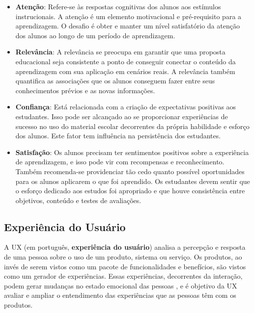 \begin{itemize}[label={},leftmargin=2em]
\item \textbf{Atenção}: Refere-se às respostas cognitivas dos alunos aos estímulos instrucionais. A atenção é um elemento motivacional e pré-requisito para a aprendizagem. O desafio é obter e manter um nível satisfatório da atenção dos alunos ao longo de um período de aprendizagem.
\end{itemize}

\begin{itemize}[label={},leftmargin=2em]
\item \textbf{Relevância}: A relevância se preocupa em garantir que uma proposta educacional seja consistente a ponto de conseguir conectar o conteúdo da aprendizagem com sua aplicação em cenários reais. A relevância também quantifica as associações que os alunos conseguem fazer entre seus conhecimentos prévios e as novas informações.
\end{itemize}

\begin{itemize}[label={},leftmargin=2em]
\item \textbf{Confiança}: Está relacionada com a criação de expectativas positivas aos estudantes. Isso pode ser alcançado ao se proporcionar experiências de sucesso no uso do material escolar decorrentes da própria habilidade e esforço dos alunos. Este fator tem influência na persistência dos estudantes.
\end{itemize}

\begin{itemize}[label={},leftmargin=2em]
\item \textbf{Satisfação}: Os alunos precisam ter sentimentos positivos sobre a experiência de aprendizagem, e isso pode vir com recompensas e reconhecimento. Também recomenda-se providenciar tão cedo quanto possível oportunidades para os alunos aplicarem o que foi aprendido. Os estudantes devem sentir que o esforço dedicado aos estudos foi apropriado e que houve consistência entre objetivos, conteúdo e testes de avaliações.
\end{itemize}

\pagebreak


\subsection{Experiência do Usuário}
\label{EEUU}

A \ac{UX} (em português, \textbf{experiência do usuário}) analisa a percepção e resposta de uma pessoa sobre o uso de um produto, sistema ou serviço. Os produtos, ao invés de serem vistos como um pacote de funcionalidades e benefícios, são vistos como um gerador de experiências. Essas experiências, decorrentes da interação, podem gerar mudanças no estado emocional das pessoas \cite{calvillo2009core}, e é objetivo da \ac{UX} avaliar e ampliar o entendimento das experiências que as pessoas têm com os produtos.

